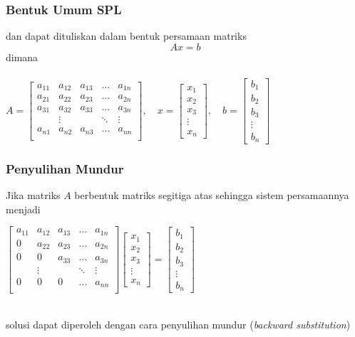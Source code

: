 \documentclass{beamer}
\begin{document}
\begin{frame}
\frametitle{Bentuk Umum SPL}
dan dapat dituliskan dalam bentuk persamaan matriks
\begin{equation}
Ax=b
\nonumber
\end{equation}
dimana \\\ \\
$A=\begin{bmatrix}
	a_{11} & a_{12} & a_{13} & \dots & a_{1n}\\
	a_{21} & a_{22} & a_{23} & \dots & a_{2n}\\
	a_{31} & a_{32} & a_{33} & \dots & a_{3n}\\
	 & \vdots &  & \ddots & \vdots\\
	a_{n1} & a_{n2} & a_{n3} & \dots & a_{nn}\\
\end{bmatrix}, \quad x=\begin{bmatrix}x_1\\x_2\\x_3\\\vdots\\x_n\end{bmatrix}, \quad b=\begin{bmatrix}b_1\\b_2\\b_3\\\vdots\\b_n\end{bmatrix}$

\end{frame}


\begin{frame}
\frametitle{Penyulihan Mundur}
Jika matriks $A$ berbentuk matriks segitiga atas sehingga sistem persamaannya menjadi
\begin{center}
$\begin{bmatrix}
	a_{11} & a_{12} & a_{13} & \dots & a_{1n}\\
	0 & a_{22} & a_{23} & \dots & a_{2n}\\
	0 & 0 & a_{33} & \dots & a_{3n}\\
	 & \vdots &  & \ddots & \vdots\\
	0 & 0 & 0 & \dots & a_{nn}\\
\end{bmatrix}\begin{bmatrix}x_1\\x_2\\x_3\\\vdots\\x_n\end{bmatrix}=\begin{bmatrix}b_1\\b_2\\b_3\\\vdots\\b_n\end{bmatrix}$
\end{center}
\ \\solusi dapat diperoleh dengan cara penyulihan mundur (\textit{backward substitution})
\end{frame}
\end{document}
